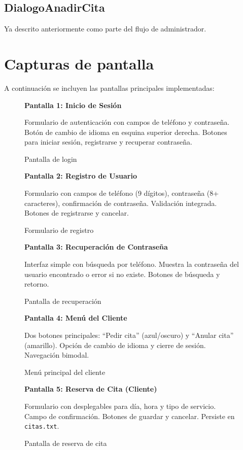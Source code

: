 \documentclass[12pt,a4paper]{report}
\begin{document}
\subsection{DialogoAnadirCita}
Ya descrito anteriormente como parte del flujo de administrador.

\section{Capturas de pantalla}
A continuación se incluyen las pantallas principales implementadas:

\begin{figure}[htbp]
    \centering
    \textbf{Pantalla 1: Inicio de Sesión}
    
    Formulario de autenticación con campos de teléfono y contraseña. Botón de cambio de idioma en esquina superior derecha. Botones para iniciar sesión, registrarse y recuperar contraseña.
    \caption{Pantalla de login}
\end{figure}

\begin{figure}[htbp]
    \centering
    \textbf{Pantalla 2: Registro de Usuario}
    
    Formulario con campos de teléfono (9 dígitos), contraseña (8+ caracteres), confirmación de contraseña. Validación integrada. Botones de registrarse y cancelar.
    \caption{Formulario de registro}
\end{figure}

\begin{figure}[htbp]
    \centering
    \textbf{Pantalla 3: Recuperación de Contraseña}
    
    Interfaz simple con búsqueda por teléfono. Muestra la contraseña del usuario encontrado o error si no existe. Botones de búsqueda y retorno.
    \caption{Pantalla de recuperación}
\end{figure}

\begin{figure}[htbp]
    \centering
    \textbf{Pantalla 4: Menú del Cliente}
    
    Dos botones principales: ``Pedir cita'' (azul/oscuro) y ``Anular cita'' (amarillo). Opción de cambio de idioma y cierre de sesión. Navegación bimodal.
    \caption{Menú principal del cliente}
\end{figure}

\begin{figure}[htbp]
    \centering
    \textbf{Pantalla 5: Reserva de Cita (Cliente)}
    
    Formulario con desplegables para día, hora y tipo de servicio. Campo de confirmación. Botones de guardar y cancelar. Persiste en \texttt{citas.txt}.
    \caption{Pantalla de reserva de cita}
\end{figure}
\end{document}
